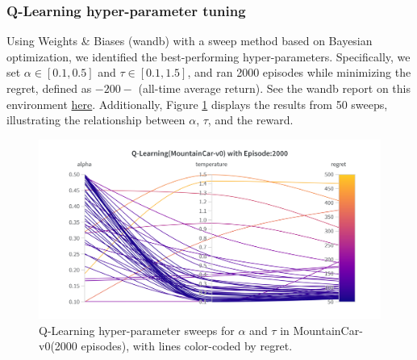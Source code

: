 \documentclass[11pt, a4]{article}
\begin{document}
			\subsubsection{Q-Learning hyper-parameter tuning}
				Using Weights \& Biases (wandb) with a sweep method based on Bayesian optimization, we identified the best-performing hyper-parameters. Specifically, we set $\alpha \in [0.1, 0.5]$ and $\tau \in [0.1, 1.5]$, and ran 2000 episodes while minimizing the regret, defined as \(-200 -\) (all-time average return). See the wandb report on this environment \href{https://wandb.ai/ee24e009-iitm/qlearning_mountain_car-v0tuning/reports/Q-Learning-MountainCar-v0---VmlldzoxMjAxNzEwMQ?accessToken=3ho3ppomqsu6prg4yd4wdhset84tq72p24zrpw8ztwcivdw8xfsjevl6tduvjfi5}{here}. Additionally, Figure \ref{fig:qlearningmountaincar-regret} displays the results from 50 sweeps, illustrating the relationship between $\alpha$, $\tau$, and the reward.
				\begin{figure}[H]
					\centering
					\includegraphics[width=1\linewidth]{qlearning-hyp-tuning-mountaincar.png}
					\caption{Q-Learning hyper-parameter sweeps for $\alpha$ and $\tau$ in MountainCar-v0(2000 episodes), with lines color-coded by regret.}
					\label{fig:qlearningmountaincar-regret}
				\end{figure}
\end{document}
